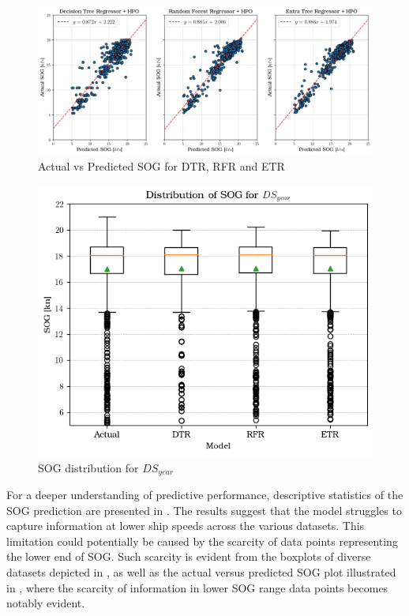 
\begin{figure}[h!]
    \centering
        \includegraphics[width=.9\textwidth]{02_figures/pred_vs_act_all_tree.png}
        \caption{Actual vs Predicted SOG for DTR, RFR and ETR}
        \label{fig:pred_vs_act_SOG}
\end{figure}

\begin{figure}
    \centering
        \includegraphics[width=.75\textwidth]{02_figures/sog_pred_year.png}
        \caption{SOG distribution for $DS_{year}$}
        \label{fig:boxplot_sogPred_yr}
\end{figure}

For a deeper understanding of predictive performance, descriptive statistics of the SOG prediction are presented in . The results suggest that the model struggles to capture information at lower ship speeds across the various datasets. This limitation could potentially be caused by the scarcity of data points representing the lower end of SOG. Such scarcity is evident from the boxplots of diverse datasets depicted in , as well as the actual versus predicted SOG plot illustrated in , where the scarcity of information in lower SOG range data points becomes notably evident.\\


